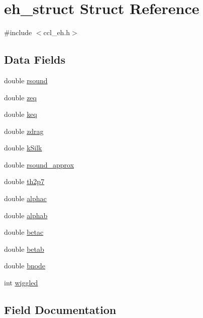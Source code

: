 \hypertarget{structeh__struct}{}\section{eh\+\_\+struct Struct Reference}
\label{structeh__struct}


{\ttfamily \#include $<$ccl\+\_\+eh.\+h$>$}

\subsection*{Data Fields}
\begin{DoxyCompactItemize}
\item 
double \mbox{\hyperlink{structeh__struct_a3e1e2d1a06f3dfac72335503ccb2b219}{rsound}}
\item 
double \mbox{\hyperlink{structeh__struct_a115be04402be00203663cbf0cdeb6ccc}{zeq}}
\item 
double \mbox{\hyperlink{structeh__struct_a9eafa98df2832dd506fee87ec8a66b6c}{keq}}
\item 
double \mbox{\hyperlink{structeh__struct_af3d1d22e42cdf316b3572a9149d98596}{zdrag}}
\item 
double \mbox{\hyperlink{structeh__struct_a5765425c588003819015e840c4393da8}{k\+Silk}}
\item 
double \mbox{\hyperlink{structeh__struct_ab3e90131494df499d4be228108c04fb7}{rsound\+\_\+approx}}
\item 
double \mbox{\hyperlink{structeh__struct_afd9583995f4670685035d05749c385f0}{th2p7}}
\item 
double \mbox{\hyperlink{structeh__struct_a58de15592e924e87fe1b838599579a70}{alphac}}
\item 
double \mbox{\hyperlink{structeh__struct_a623316721501ca221093de25e216ac9f}{alphab}}
\item 
double \mbox{\hyperlink{structeh__struct_a9858b8089eb528b279fd4ce1dd1796b7}{betac}}
\item 
double \mbox{\hyperlink{structeh__struct_a9239bc067352dd1320a9b56ca6af8cae}{betab}}
\item 
double \mbox{\hyperlink{structeh__struct_a1448d0f2f95eb0d06b24b7f580c59142}{bnode}}
\item 
int \mbox{\hyperlink{structeh__struct_ac0d14bbaf13c9a0af9759ef0411ed523}{wiggled}}
\end{DoxyCompactItemize}


\subsection{Field Documentation}
\mbox{\label{structeh__struct_a623316721501ca221093de25e216ac9f}} 
